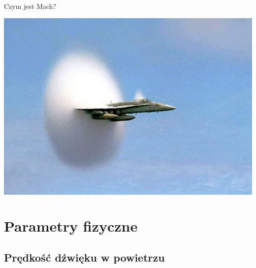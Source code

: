 \documentclass{beamer}
\begin{document}

\begin{frame}{Czym jest Mach?}

	\includegraphics[width=\linewidth]{mach.jpg}

\end{frame}

\section{Parametry fizyczne}

\subsection{Prędkość dźwięku w powietrzu}
\end{document}

